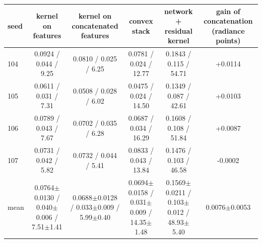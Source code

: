 \begin{tabular}{lccccc}
\toprule
seed & kernel on features & kernel on concatenated features & convex stack & network + residual kernel & gain of concatenation (radiance points) \\
\midrule
104 & 0.0924 / 0.044 / 9.25 & 0.0810 / 0.025 / 6.25 & 0.0781 / 0.024 / 12.77 & 0.1843 / 0.115 / 54.71 & +0.0114 \\
105 & 0.0611 / 0.031 / 7.31 & 0.0508 / 0.028 / 6.02 & 0.0475 / 0.024 / 14.50 & 0.1349 / 0.087 / 42.61 & +0.0103 \\
106 & 0.0789 / 0.043 / 7.67 & 0.0702 / 0.035 / 6.28 & 0.0687 / 0.034 / 16.29 & 0.1608 / 0.108 / 51.84 & +0.0087 \\
107 & 0.0731 / 0.042 / 5.82 & 0.0732 / 0.044 / 5.41 & 0.0833 / 0.043 / 13.84 & 0.1476 / 0.103 / 46.58 & -0.0002 \\
\midrule
mean & 0.0764$\pm$0.0130 / 0.040$\pm$0.006 / 7.51$\pm$1.41 & 0.0688$\pm$0.0128 / 0.033$\pm$0.009 / 5.99$\pm$0.40 & 0.0694$\pm$0.0158 / 0.031$\pm$0.009 / 14.35$\pm$1.48 & 0.1569$\pm$0.0211 / 0.103$\pm$0.012 / 48.93$\pm$5.40 & 0.0076$\pm$0.0053 \\
\bottomrule
\end{tabular}
